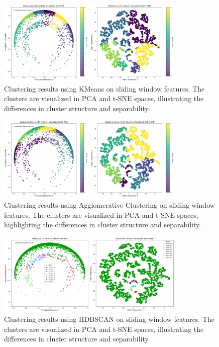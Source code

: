 \documentclass[a4paper,12pt,twoside]{article}
\begin{document}
\begin{figure}[H]
    \centering
    \includegraphics[width=0.8\textwidth]{img/sliding window kmeans.png}
    \caption{Clustering results using KMeans on sliding window features. The clusters are visualized in PCA and t-SNE spaces, illustrating the differences in cluster structure and separability.}
\end{figure}

\begin{figure}[H]
    \centering
    \includegraphics[width=0.8\textwidth]{img/sliding window agglomerative.png}
    \caption{Clustering results using Agglomerative Clustering on sliding window features. The clusters are visualized in PCA and t-SNE spaces, highlighting the differences in cluster structure and separability.}
    \label{fig:agglomerative_clustering}
\end{figure}

\begin{figure}[H]
    \centering
    \includegraphics[width=0.8\textwidth]{img/sliding window hdbscan.png}
    \caption{Clustering results using HDBSCAN on sliding window features. The clusters are visualized in PCA and t-SNE spaces, illustrating the differences in cluster structure and separability.}
    \label{fig:hdbscan_clustering}
\end{figure}
\end{document}

